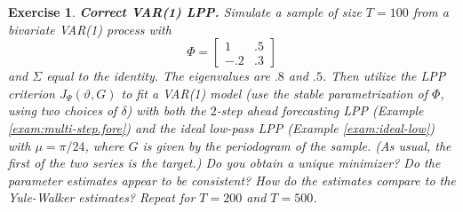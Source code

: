 \documentclass[a4paper]{book}
\newtheorem{Exercise}{Exercise}
\begin{document}


\begin{Exercise} {\bf Correct VAR(1) LPP.} \rm
\label{exer:var1lpp-correct}
 Simulate a sample of size $T=100$ from a
  bivariate VAR(1) process with 
\[
  \Phi = \left[ \begin{array}{ll} 1 & .5 \\ -.2 & .3 \end{array} \right]
\]
 and $\Sigma$ equal to the identity.  The eigenvalues are $.8$ and $.5$.
 Then utilize the LPP criterion $J_{\Psi} (\vartheta, G)$ to fit a VAR(1) model (use
  the stable parametrization of $\Phi$, using two choices of $\delta$) with both 
 the $2$-step ahead forecasting LPP (Example \ref{exam:multi-step.fore}) and the 
 ideal low-pass  LPP (Example \ref{exam:ideal-low}) with 
  $\mu = \pi/24$, where $G$ is given by the periodogram of the sample.
 (As usual, the first of the two series is the target.)
 Do you obtain a unique minimizer?    Do the parameter estimates appear to be consistent? 
  How do the estimates compare to the Yule-Walker estimates?
 Repeat for $T=200$ and $T=500$.
\end{Exercise}
\end{document}
